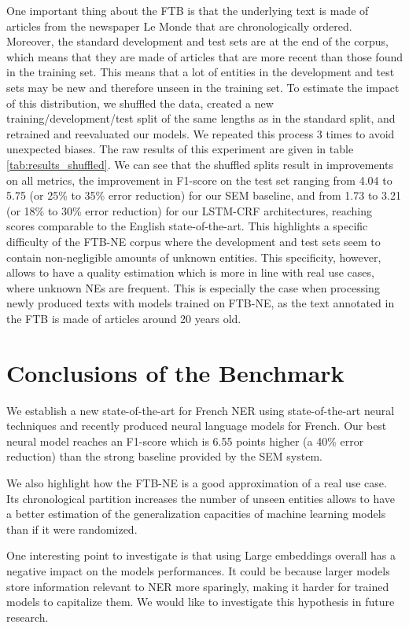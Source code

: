 One important thing about the FTB is that the underlying text is made of articles from the newspaper Le Monde that are chronologically ordered. Moreover, the standard development and test sets are at the end of the corpus, which means that they are made of articles that are more recent than those found in the training set. This means that a lot of entities in the development and test sets may be new and therefore unseen in the training set. To estimate the impact of this distribution, we shuffled the data, created a new training/development/test split of the same lengths as in the standard split, and retrained and reevaluated our models. We repeated this process 3 times to avoid unexpected biases. The raw results of this experiment are given in table \ref{tab:results_shuffled}. We can see that the shuffled splits result in improvements on all metrics, the improvement in F1-score on the test set ranging from 4.04 to 5.75 (or 25\% to 35\% error reduction) for our SEM baseline, and from 1.73 to 3.21 (or 18\% to 30\% error reduction) for our LSTM-CRF architectures, reaching scores comparable to the English state-of-the-art. This highlights a specific difficulty of the FTB-NE corpus where the development and test sets seem to contain non-negligible amounts of unknown entities. This specificity, however, allows to have a quality estimation which is more in line with real use cases, where unknown NEs are frequent. This is especially the case when processing newly produced texts with models trained on FTB-NE, as the text annotated in the FTB is made of articles around 20 years old.

\section{Conclusions of the Benchmark}
\label{sec:conclusion}

We establish a new state-of-the-art for French NER using state-of-the-art neural techniques and recently produced neural language models for French. Our best neural model reaches an F1-score which is 6.55 points higher (a 40\% error reduction) than the strong baseline provided by the SEM system.

We also highlight how the FTB-NE is a good approximation of a real use case. Its chronological partition increases the number of unseen entities allows to have a better estimation of the generalization capacities of machine learning models than if it were randomized.

One interesting point to investigate is that using Large embeddings overall has a negative impact on the models performances. It could be because larger models store information relevant to NER more sparingly, making it harder for trained models to capitalize them. We would like to investigate this hypothesis in future research.

